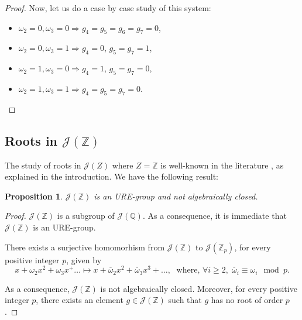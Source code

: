 \documentclass[preprint,12pt]{elsarticle}
\newtheorem{prop}[thm]{Proposition}
\begin{document}
\begin{proof}
\noindent Now, let us do a case by case study of this system:
\begin{itemize}
\item $\omega_2=0,\omega_3=0\Rightarrow g_4=g_5=g_6=g_7=0$,

\item $\omega_2=0,\omega_3=1\Rightarrow g_4=0$, $g_5=g_7=1$,

\item $\omega_2=1,\omega_3=0\Rightarrow g_4=1$, $g_5=g_7=0$,

\item $\omega_2=1,\omega_3=1\Rightarrow g_4=g_5=g_7=0$.

\end{itemize}
$ $
\end{proof}



\subsection{Roots in \texorpdfstring{$\mathcal J(\mathbb Z)$}{J(Z)}}



The study of roots in $\mathcal{J}(Z)$ where $Z = \mathbb Z$ is well-known in the literature \cite{B}, as explained in the introduction. We have the following result: 

\begin{prop}
$\mathcal J(\mathbb Z)$ is an URE-group and not algebraically closed.    
\end{prop}
\begin{proof} \noindent $\mathcal J(\mathbb Z)$ is a subgroup of $\mathcal J(\mathbb Q)$. As a consequence, it is immediate that $\mathcal J(\mathbb Z)$ is an URE-group. \\

\medskip

\noindent There exists a surjective homomorhism from $\mathcal J(\mathbb Z)$ to $\mathcal J(\mathbb Z_p)$, for every positive integer $p$, given by
$$x+\omega_2x^2+\omega_3x^+\ldots\longmapsto x+\overline\omega_2x^2+\overline\omega_3x^3+\ldots,\;\text{ where, }\forall i\geq 2,\;  \overline\omega_i\equiv \omega_i\mod p.$$

\noindent As a consequence, $\mathcal J(\mathbb Z)$ is not algebraically closed. Moreover, for every positive integer $p$, there exists an element  $g\in\mathcal J(\mathbb Z)$ such that $g$ has no root of order $p$.
\end{proof}
\end{document}

